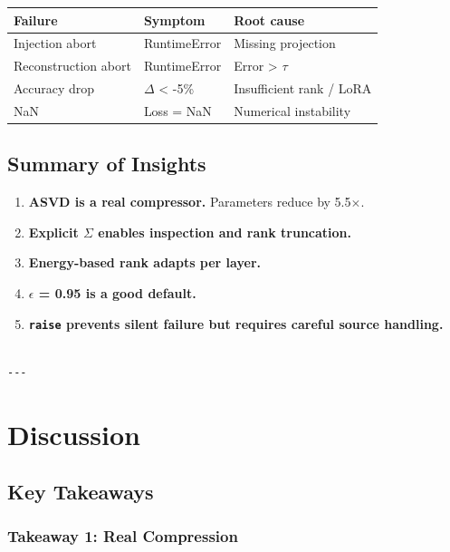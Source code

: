 \begin{table}[H]
\centering
\small
\begin{tabular}{lll}
\toprule
\textbf{Failure} & \textbf{Symptom} & \textbf{Root cause} \\
\midrule
Injection abort & RuntimeError & Missing projection \\
Reconstruction abort & RuntimeError & Error \textgreater{} $\tau$ \\
Accuracy drop & $\Delta$ \textless{} -5\% & Insufficient rank / LoRA \\
NaN & Loss = NaN & Numerical instability \\
\bottomrule
\end{tabular}
\end{table}

\subsection{Summary of Insights}

\begin{enumerate}
\item \textbf{ASVD is a real compressor.} Parameters reduce by 5.5$\times$.
\item \textbf{Explicit $\Sigma$ enables inspection and rank truncation.}
\item \textbf{Energy-based rank adapts per layer.}
\item \textbf{$\epsilon$ = 0.95 is a good default.}
\item \textbf{\texttt{raise} prevents silent failure but requires careful source handling.}
\end{enumerate}
\begin{lstlisting}

---
\end{lstlisting}


\section{Discussion}

\subsection{Key Takeaways}

\subsubsection{Takeaway 1: Real Compression}

